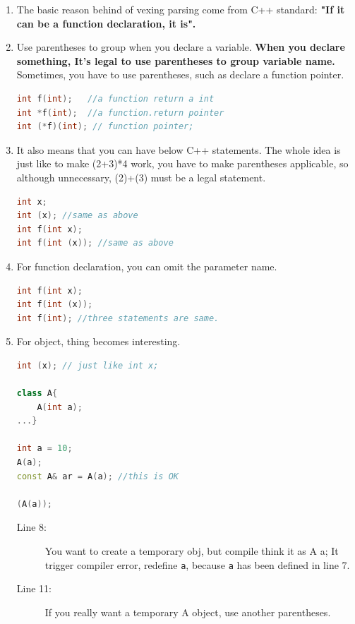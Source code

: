 \documentclass[a4paper,11pt,twoside]{book}
\begin{document}
\begin{enumerate}
	\item The basic reason behind of vexing parsing come from C++ standard: \textbf{"If it can be a function declaration, it is".}
	
	\item Use parentheses to group when you declare a variable. \textbf{When you declare something, It's legal to use parentheses to group variable name.} Sometimes, you have to use parentheses, such as declare a function pointer. 
\begin{lstlisting}[frame=single, language=c++, mathescape=true]
int f(int);   //a function return a int
int *f(int);  //a function.return pointer
int (*f)(int); // function pointer;  
\end{lstlisting}
	
	\item It also means that you can have below C++ statements. The whole idea is just like to make (2+3)*4 work, you have to make parentheses applicable, so although unnecessary, (2)+(3) must be a legal statement.
\begin{lstlisting}[frame=single, language=c++, mathescape=true]
int x;
int (x); //same as above
int f(int x);
int f(int (x)); //same as above
\end{lstlisting}
	
	\item For function declaration, you can omit the parameter name.  
\begin{lstlisting}[frame=single, language=c++, mathescape=true]
int f(int x);
int f(int (x));
int f(int); //three statements are same. 
\end{lstlisting}
	
	\item For object, thing becomes interesting.
\begin{lstlisting}[frame=single, language=c++, mathescape=true]
int (x); // just like int x;

class A{
	A(int a);
...}
	
int a = 10; 
A(a);
const A& ar = A(a); //this is OK

(A(a)); 
\end{lstlisting}
\begin{description}
	\item[Line 8:] You want to create a temporary obj, but compile think it as A a; It trigger compiler error, redefine \texttt{a}, because \texttt{a} has been defined in line 7.
	\item[Line 11:] If you really want a temporary A object, use another parentheses. 
\end{description}
	

\end{enumerate}
\end{document}
